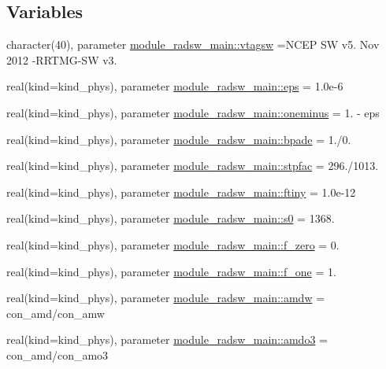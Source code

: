 \subsection*{Variables}
\begin{DoxyCompactItemize}
\item 
character(40), parameter \hyperlink{namespacemodule__radsw__main_a93334abce2ca8bfdcdfe5edd4ae1f093}{module\+\_\+radsw\+\_\+main\+::vtagsw} =\textquotesingle{}N\+C\+EP SW v5. Nov 2012 -\/R\+R\+T\+MG-\/SW v3. \textquotesingle{}
\item 
real(kind=kind\+\_\+phys), parameter \hyperlink{group__module__radsw__main_ga7d311ceb7f824ea31d31ba8144751b5a}{module\+\_\+radsw\+\_\+main\+::eps} = 1.\+0e-\/6
\item 
real(kind=kind\+\_\+phys), parameter \hyperlink{group__module__radsw__main_gac666738c31ea648cae506a47e5a4e43d}{module\+\_\+radsw\+\_\+main\+::oneminus} = 1. -\/ eps
\item 
real(kind=kind\+\_\+phys), parameter \hyperlink{group__module__radsw__main_gacd9ae7c14cbfdc55f1f0fff637ca0331}{module\+\_\+radsw\+\_\+main\+::bpade} = 1./0.
\item 
real(kind=kind\+\_\+phys), parameter \hyperlink{group__module__radsw__main_ga4d32ea8f0f1bca37e3351a5ae5077f77}{module\+\_\+radsw\+\_\+main\+::stpfac} = 296./1013.
\item 
real(kind=kind\+\_\+phys), parameter \hyperlink{group__module__radsw__main_gabe91ed52b6016e99a2d0c874524fb27f}{module\+\_\+radsw\+\_\+main\+::ftiny} = 1.\+0e-\/12
\item 
real(kind=kind\+\_\+phys), parameter \hyperlink{group__module__radsw__main_ga244c149eb05c0675a7e040dbf7e2bc4b}{module\+\_\+radsw\+\_\+main\+::s0} = 1368.
\item 
real(kind=kind\+\_\+phys), parameter \hyperlink{group__module__radsw__main_gad54ac2d2bd5c4b3bd692c76d2a0bcc5d}{module\+\_\+radsw\+\_\+main\+::f\+\_\+zero} = 0.
\item 
real(kind=kind\+\_\+phys), parameter \hyperlink{group__module__radsw__main_gad256aaca9c9d6b5d161ae21f68989db6}{module\+\_\+radsw\+\_\+main\+::f\+\_\+one} = 1.
\item 
real(kind=kind\+\_\+phys), parameter \hyperlink{group__module__radsw__main_ga1445a63250d89083447371120c484618}{module\+\_\+radsw\+\_\+main\+::amdw} = con\+\_\+amd/con\+\_\+amw
\item 
real(kind=kind\+\_\+phys), parameter \hyperlink{group__module__radsw__main_ga527e5e1cec6ad0800f69a606fde77369}{module\+\_\+radsw\+\_\+main\+::amdo3} = con\+\_\+amd/con\+\_\+amo3

\end{DoxyCompactItemize}
